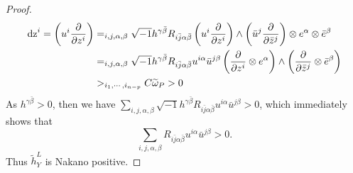 \documentclass[lang=en,12pt]{beautybook}
\begin{document}
\begin{proof}
\begin{align*}
    \operatorname{dz}^i = \left( u^i \frac{\partial}{\partial z^i} \right)                            & = \relax_{i, j, \alpha, \beta} \sqrt{- 1} h^{\gamma \bar{\beta}} R_{i \bar{j}
    \alpha \bar{\beta}}   \left( u^i \frac{\partial}{\partial z^i} \right)\wedge \left( \bar{u}^j \frac{\partial}{\partial \bar{z}^j} \right) \otimes e^{\alpha} \otimes \bar{e}^{\beta}                                                                                                                                                                                         \\
                                                                                              & =  \relax_{i, j, \alpha, \beta} \sqrt{- 1} h^{\gamma \bar{\beta}} R_{i\bar{j} \alpha \bar{\beta}}  u^{i \alpha} \bar{u}^{j \beta} \left( \frac{\partial}{\partial z^i} \otimes e^{\alpha} \right) \wedge \left( \frac{\partial}{\partial\bar{z}^j} \otimes \bar{e}^{\beta} \right) \\
                                                                                              & >  \relax_{i_1, \cdots, i_{n - p}} C \widetilde{\omega}_P > 0
  \end{align*}
  As $h^{\gamma\bar{\beta}}>0$, then we have $\sum_{i, j, \alpha, \beta} \sqrt{- 1} h^{\gamma \bar{\beta}} R_{i
        \bar{j} \alpha \bar{\beta}}  u^{i \alpha} \bar{u}^{j \beta}>0$, which immediately shows that $$\sum_{i, j, \alpha, \beta} R_{i
        \bar{j} \alpha \bar{\beta}}  u^{i \alpha} \bar{u}^{j \beta}>0.$$ Thus $\widetilde{h}^{L }_Y$ is Nakano positive.
\end{proof}
\end{document}
